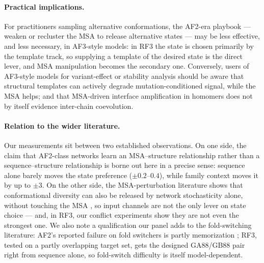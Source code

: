 \documentclass[11pt]{article}
\begin{document}
\paragraph{Practical implications.}
For practitioners sampling alternative conformations, the AF2-era playbook
--- weaken or recluster the MSA to release alternative states
\cite{delalamo2022,stein2022,wayment2024,kalakoti2025} --- may be less
effective, and less necessary, in AF3-style models: in RF3 the state is
chosen primarily by the template track, so supplying a template of the
desired state is the direct lever, and MSA manipulation becomes the
secondary one. Conversely, users of AF3-style models for variant-effect or
stability analysis should be aware that structural templates can actively
degrade mutation-conditioned signal, while the MSA helps; and that
MSA-driven interface amplification in homomers does not by itself evidence
inter-chain coevolution.

\paragraph{Relation to the wider literature.}
Our measurements sit between two established observations. On one side, the
claim that AF2-class networks learn an MSA--structure relationship rather
than a sequence--structure relationship \cite{ahdritz2024,vargas2025} is
borne out here in a precise sense: sequence alone barely moves the state
preference ($\pm 0.2$--$0.4$), while family context moves it by up to
$\pm 3$. On the other side, the MSA-perturbation literature shows that
conformational diversity can also be released by network stochasticity
alone, without touching the MSA \cite{wallner2023}, so input channels are
not the only lever on state choice --- and, in RF3, our conflict experiments
show they are not even the strongest one. We also note a qualification our
panel adds to the fold-switching literature: AF2's reported failure on fold
switchers is partly memorization \cite{chakravarty2024}; RF3, tested on a
partly overlapping target set, gets the designed GA88/GB88 pair right from
sequence alone, so fold-switch difficulty is itself model-dependent.
\end{document}
